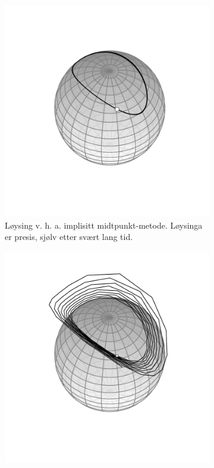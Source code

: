 \documentclass[12pt]{article}
\begin{document}
\noindent\begin{minipage}[!b]{\textwidth}
    \nablarule
    \begin{figure}[H]
        \centering
        \begin{subfigure}{.4\textwidth}
        \centering
        \includegraphics[width=\linewidth]{rk}
        \caption{
            Løysing v. h. a. implisitt midtpunkt-metode.
            Løysinga er presis, sjølv etter svært lang tid.
        }
        \label{fig:rk}
    \end{subfigure} \hspace{.05\textwidth}
        \begin{subfigure}{.4\textwidth}
        \centering
        \includegraphics[width=\linewidth]{euler}

\end{subfigure}
\end{figure}
\end{minipage}
\end{document}
